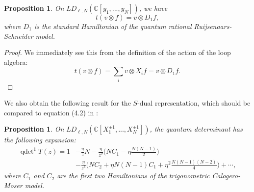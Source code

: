 \documentclass[11pt]{report}
\newtheorem{prop}[theorem]{Proposition}
\theoremstyle{definition}
\theoremstyle{remark}
\theoremstyle{remark}
\newcommand{\C}{\mathbb{C}}
\begin{document}
\begin{prop}
On $LD_{\ell,N}(\C[y_1,...,y_N])$, we have
\begin{equation*}
t(v \otimes f) = v \otimes D_1 f,
\end{equation*}
where $D_1$ is the standard Hamiltonian of the quantum rational Ruijsenaars-Schneider model.
\end{prop}

\begin{proof}
We immediately see this from the definition of the action of the loop algebra:
\begin{equation*}
t(v \otimes f) = \sum_i v \otimes X_i f = v \otimes D_1 f.
\end{equation*}
\end{proof}

We also obtain the following result for the $S$-dual representation, which should be compared to equation (4.2) in \cite{article:bernard:1993}:

\begin{prop}
On $LD_{\ell,N}(\C[X_1^{\pm 1},...,X_N^{\pm 1}])$, the quantum determinant has the following expansion:
\begin{align*}
\operatorname{qdet}^1 T(z)
= 1 &- \frac{\eta}{z} N - \frac{\eta}{z^2} \bigg( N C_1 - \eta \frac{N(N-1)}{2} \bigg) \\
&- \frac{\eta}{z^3} \bigg( N C_2 + \eta N (N-1) C_1 + \eta^2 \frac{N(N-1)(N-2)}{4} \bigg) + \cdots,
\end{align*}
where $C_1$ and $C_2$ are the first two Hamiltonians of the trigonometric Calogero-Moser model.
\end{prop}
\end{document}
